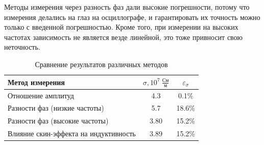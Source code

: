 \documentclass[a4paper, 12pt]{article}
\begin{document}
	Методы измерения через разность фаз дали высокие погрешности, потому что измерения делались на глаз на осциллографе, и гарантировать их точность можно только с введенной погрешностью. Кроме того, при измерении на высоких частотах зависимость не является везде линейной, это тоже привносит свою неточность.
\begin{table}[h!]
		\begin{center}
			\begin{tabular}{|l|c|c|}
				\hline
				Метод измерения & $\sigma, 10^{7} \ \frac{\text{См}}{\text{м}}$ & $\varepsilon_{\sigma}$\\
				\hline
				Отношение амплитуд & 4.3 & 0.1\%\\ \hline
				Разности фаз (низкие частоты) & 5.7 & 18.6\%\\ \hline
				Разности фаз (высокие частоты) & 3.80 & 15.2\%\\ \hline
                Влияние скин-эффекта на индуктивность & 3.89 & 15.2\%\\ \hline
			\end{tabular}
		\end{center}
		\caption{Сравнение результатов различных методов}\label{}
\end{table}
\end{document}
